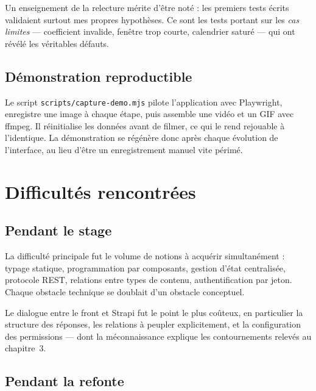 \documentclass[11pt,a4paper]{report}
\begin{document}
Un enseignement de la relecture mérite d'être noté : les premiers tests écrits
validaient surtout mes propres hypothèses. Ce sont les tests portant sur les
\emph{cas limites} --- coefficient invalide, fenêtre trop courte, calendrier
saturé --- qui ont révélé les véritables défauts.

\section{Démonstration reproductible}

Le script \texttt{scripts/capture-demo.mjs} pilote l'application avec Playwright,
enregistre une image à chaque étape, puis assemble une vidéo et un GIF avec ffmpeg.
Il réinitialise les données avant de filmer, ce qui le rend rejouable à
l'identique. La démonstration se régénère donc après chaque évolution de
l'interface, au lieu d'être un enregistrement manuel vite périmé.

\chapter{Difficultés rencontrées}

\section{Pendant le stage}

La difficulté principale fut le volume de notions à acquérir simultanément :
typage statique, programmation par composants, gestion d'état centralisée,
protocole REST, relations entre types de contenu, authentification par jeton.
Chaque obstacle technique se doublait d'un obstacle conceptuel.

Le dialogue entre le front et Strapi fut le point le plus coûteux, en particulier
la structure des réponses, les relations à peupler explicitement, et la
configuration des permissions --- dont la méconnaissance explique les
contournements relevés au chapitre~3.

\section{Pendant la refonte}
\end{document}

